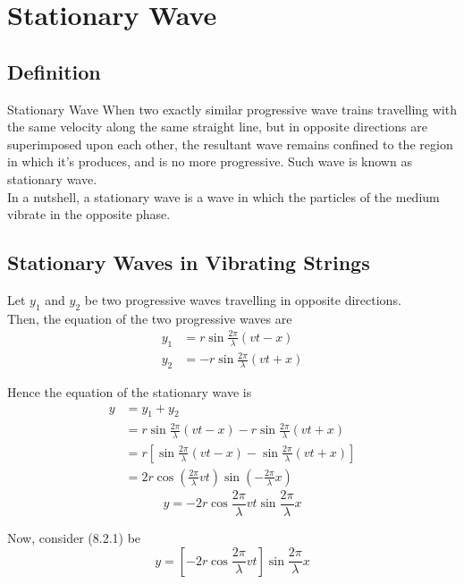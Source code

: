 \documentclass[12pt]{article}
\numberwithin{equation}{subsection}
\begin{document}
\section{Stationary Wave}
\subsection{Definition}
\begin{definition}{Stationary Wave}{}
    When two exactly similar progressive wave trains travelling with the same velocity along the same straight line, but in opposite directions are superimposed upon each other, the resultant wave remains confined to the region in which it's produces, and is no more progressive. Such wave is known as stationary wave. \\
    In a nutshell, a stationary wave is a wave in which the particles of the medium vibrate in the opposite phase.
\end{definition}

\subsection{Stationary Waves in Vibrating Strings}
Let $y_1$ and $y_2$ be two progressive waves travelling in opposite directions. \\
Then, the equation of the two progressive waves are
\begin{align*}
    y_1 &= r \sin{\frac{2\pi}{\lambda}(vt - x)} \\
    y_2 &= - r \sin{\frac{2\pi}{\lambda}(vt + x)}
\end{align*}

Hence the equation of the stationary wave is
\begin{align*}
    y &= y_1 + y_2 \\
    &= r \sin{\frac{2\pi}{\lambda}(vt - x)} - r \sin{\frac{2\pi}{\lambda}(vt + x)} \\
    &= r \left[ \sin{\frac{2\pi}{\lambda}(vt - x)} - \sin{\frac{2\pi}{\lambda}(vt + x)} \right] \\
    &= 2r \cos{\left( \frac{2\pi}{\lambda}vt \right)} \sin{\left( -\frac{2\pi}{\lambda}x \right)}
\end{align*}
\begin{equation}
    \boxed{ y = - 2r \cos{\frac{2\pi}{\lambda}vt} \sin{\frac{2\pi}{\lambda}x} }
\end{equation}

Now, consider (8.2.1) be
\begin{equation}
    y = \left[ - 2r \cos{\frac{2\pi}{\lambda}vt} \right] \sin{\frac{2\pi}{\lambda}x}
\end{equation}
\end{document}
